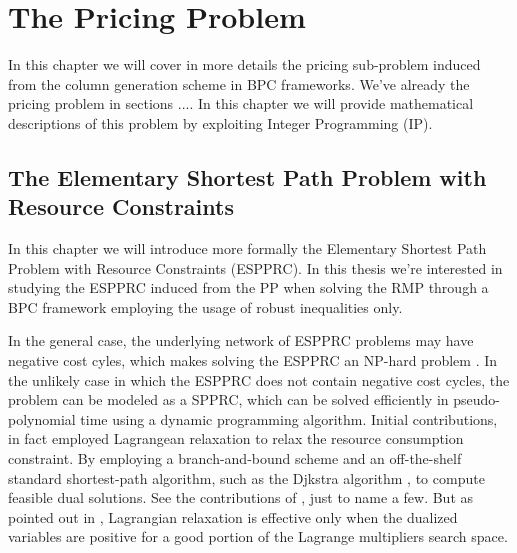 \chapter{The Pricing Problem}
\label{sec:the-pricing-problem}


In this chapter we will cover in more details the pricing sub-problem
induced from the column generation scheme in BPC frameworks.
We've already the pricing problem in sections ....
In this chapter we will provide mathematical descriptions
of this problem by exploiting Integer Programming (IP).

\section{The Elementary Shortest Path Problem with Resource Constraints}
\label{sec:the-elementary-shortest-path-problem-with-resource-constraints}


In this chapter we will introduce more formally the Elementary Shortest Path Problem with Resource Constraints (ESPPRC).
In this thesis we're interested in studying the ESPPRC induced from the PP when solving the RMP through a BPC framework employing the usage of robust inequalities only.

In the general case,
the underlying network of ESPPRC problems may have negative cost cyles,
which makes solving the ESPPRC an NP-hard problem \parencite{dror1994}.
In the unlikely case in which the ESPPRC does not contain negative cost cycles,
the problem can be modeled as a SPPRC, which can be solved efficiently in pseudo-polynomial time using
a dynamic programming algorithm.
Initial contributions, in fact employed Lagrangean relaxation to relax the
resource consumption constraint.
By employing a branch-and-bound scheme and an off-the-shelf standard shortest-path algorithm,
such as the Djkstra algorithm \parencite{sniedovich2006dijkstra}, to compute feasible dual solutions.
See the contributions of \textcite{beasley1989, dumitrescu2003improved, carlyle2008, muhandiramge2009simultaneous}, just to name a few.
But as pointed out in \textcite{righini2004},
Lagrangian relaxation is effective only when the dualized variables
are positive for a good portion of the Lagrange multipliers search space.

